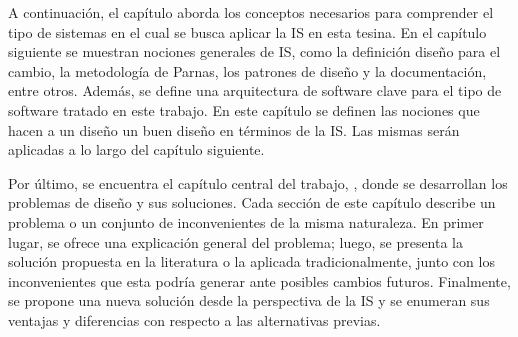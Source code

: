 A continuación, el capítulo  aborda los conceptos necesarios para comprender el tipo de sistemas en el cual se busca aplicar la IS en esta tesina. En el capítulo siguiente  se muestran nociones generales de IS, como la definición diseño para el cambio, la metodología de Parnas, los patrones de diseño y la documentación, entre otros. Además, se define una arquitectura de software clave para el tipo de software tratado en este trabajo. En este capítulo se definen las nociones que hacen a un diseño un buen diseño en términos de la IS. Las mismas serán aplicadas a lo largo del capítulo siguiente.

Por último, se encuentra el capítulo central del trabajo, , donde se desarrollan los problemas de diseño y sus soluciones. Cada sección de este capítulo describe un problema o un conjunto de inconvenientes de la misma naturaleza. En primer lugar, se ofrece una explicación general del problema; luego, se presenta la solución propuesta en la literatura o la aplicada tradicionalmente, junto con los inconvenientes que esta podría generar ante posibles cambios futuros. Finalmente, se propone una nueva solución desde la perspectiva de la IS y se enumeran sus ventajas y diferencias con respecto a las alternativas previas.


